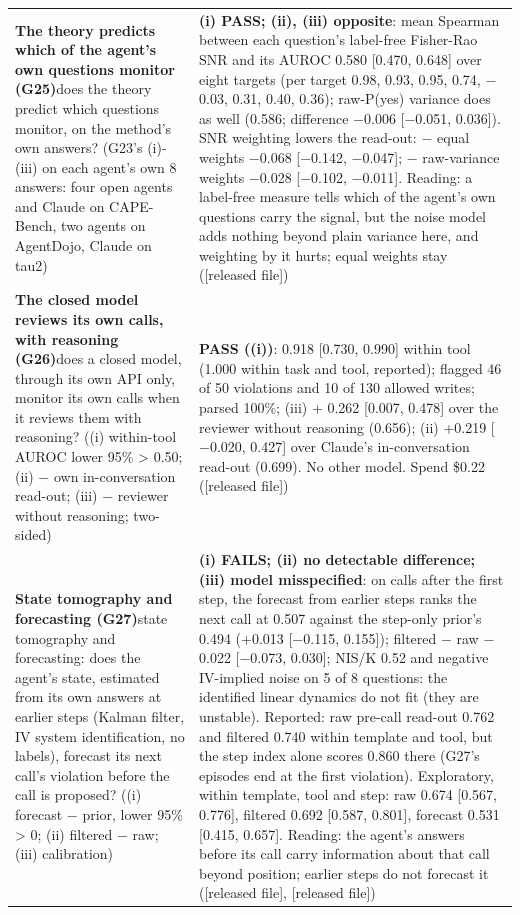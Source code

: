 {\begin{longtable}{p{}p{}}
\textbf{The theory predicts which of the agent's own questions monitor (G25)}\newline does the theory predict which questions monitor, on the method's own answers? (G23's (i)-(iii) on each agent's own 8 answers: four open agents and Claude on CAPE-Bench, two agents on AgentDojo, Claude on tau2) & \textbf{(i) PASS; (ii), (iii) opposite}: mean Spearman between each question's label-free Fisher-Rao SNR and its AUROC 0.580 [0.470, 0.648] over eight targets (per target 0.98, 0.93, 0.95, 0.74, $-$0.03, 0.31, 0.40, 0.36); raw-P(yes) variance does as well (0.586; difference $-$0.006 [$-$0.051, 0.036]). SNR weighting lowers the read-out: $-$ equal weights $-$0.068 [$-$0.142, $-$0.047]; $-$ raw-variance weights $-$0.028 [$-$0.102, $-$0.011]. Reading: a label-free measure tells which of the agent's own questions carry the signal, but the noise model adds nothing beyond plain variance here, and weighting by it hurts; equal weights stay ([released file])\\[2pt]
\textbf{The closed model reviews its own calls, with reasoning (G26)}\newline does a closed model, through its own API only, monitor its own calls when it reviews them with reasoning? ((i) within-tool AUROC lower 95\% > 0.50; (ii) $-$ own in-conversation read-out; (iii) $-$ reviewer without reasoning; two-sided) & \textbf{PASS ((i))}: 0.918 [0.730, 0.990] within tool (1.000 within task and tool, reported); flagged 46 of 50 violations and 10 of 130 allowed writes; parsed 100\%; (iii) + 0.262 [0.007, 0.478] over the reviewer without reasoning (0.656); (ii) +0.219 [$-$0.020, 0.427] over Claude's in-conversation read-out (0.699). No other model. Spend \$0.22 ([released file])\\[2pt]
\textbf{State tomography and forecasting (G27)}\newline state tomography and forecasting: does the agent's state, estimated from its own answers at earlier steps (Kalman filter, IV system identification, no labels), forecast its next call's violation before the call is proposed? ((i) forecast $-$ prior, lower 95\% > 0; (ii) filtered $-$ raw; (iii) calibration) & \textbf{(i) FAILS; (ii) no detectable difference; (iii) model misspecified}: on calls after the first step, the forecast from earlier steps ranks the next call at 0.507 against the step-only prior's 0.494 (+0.013 [$-$0.115, 0.155]); filtered $-$ raw $-$0.022 [$-$0.073, 0.030]; NIS/K 0.52 and negative IV-implied noise on 5 of 8 questions: the identified linear dynamics do not fit (they are unstable). Reported: raw pre-call read-out 0.762 and filtered 0.740 within template and tool, but the step index alone scores 0.860 there (G27's episodes end at the first violation). Exploratory, within template, tool and step: raw 0.674 [0.567, 0.776], filtered 0.692 [0.587, 0.801], forecast 0.531 [0.415, 0.657]. Reading: the agent's answers before its call carry information about that call beyond position; earlier steps do not forecast it ([released file], [released file])\\[2pt]

\end{longtable}}

